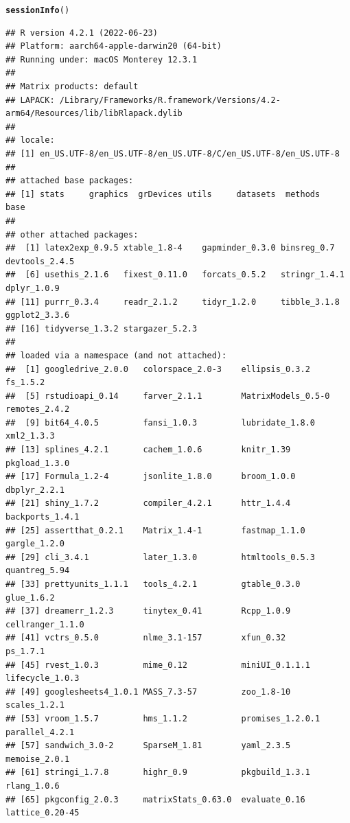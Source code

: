 \documentclass{article}\usepackage[]{graphicx}\usepackage[]{xcolor}
\makeatletter
\newcommand{\hlstd}[1]{\textcolor[rgb]{0.345,0.345,0.345}{#1}}%
\newcommand{\hlkwd}[1]{\textcolor[rgb]{0.737,0.353,0.396}{\textbf{#1}}}%
\newenvironment{kframe}{%
 \def\at@end@of@kframe{}%
 \ifinner\ifhmode%
  \def\at@end@of@kframe{\end{minipage}}%
  \begin{minipage}{\columnwidth}%
 \fi\fi%
 \def\FrameCommand##1{\hskip\@totalleftmargin \hskip-\fboxsep
 \colorbox{shadecolor}{##1}\hskip-\fboxsep
     \hskip-\linewidth \hskip-\@totalleftmargin \hskip\columnwidth}%
 \MakeFramed {\advance\hsize-\width
   \@totalleftmargin\z@ \linewidth\hsize
   \@setminipage}}%
 {\par\unskip\endMakeFramed%
 \at@end@of@kframe}
\newenvironment{knitrout}{}{} %
\makeatother
\begin{document}
\begin{knitrout}
\color{fgcolor}\begin{kframe}
\begin{alltt}
\hlkwd{sessionInfo}\hlstd{()}
\end{alltt}
\begin{verbatim}
## R version 4.2.1 (2022-06-23)
## Platform: aarch64-apple-darwin20 (64-bit)
## Running under: macOS Monterey 12.3.1
## 
## Matrix products: default
## LAPACK: /Library/Frameworks/R.framework/Versions/4.2-arm64/Resources/lib/libRlapack.dylib
## 
## locale:
## [1] en_US.UTF-8/en_US.UTF-8/en_US.UTF-8/C/en_US.UTF-8/en_US.UTF-8
## 
## attached base packages:
## [1] stats     graphics  grDevices utils     datasets  methods   base     
## 
## other attached packages:
##  [1] latex2exp_0.9.5 xtable_1.8-4    gapminder_0.3.0 binsreg_0.7     devtools_2.4.5 
##  [6] usethis_2.1.6   fixest_0.11.0   forcats_0.5.2   stringr_1.4.1   dplyr_1.0.9    
## [11] purrr_0.3.4     readr_2.1.2     tidyr_1.2.0     tibble_3.1.8    ggplot2_3.3.6  
## [16] tidyverse_1.3.2 stargazer_5.2.3
## 
## loaded via a namespace (and not attached):
##  [1] googledrive_2.0.0   colorspace_2.0-3    ellipsis_0.3.2      fs_1.5.2           
##  [5] rstudioapi_0.14     farver_2.1.1        MatrixModels_0.5-0  remotes_2.4.2      
##  [9] bit64_4.0.5         fansi_1.0.3         lubridate_1.8.0     xml2_1.3.3         
## [13] splines_4.2.1       cachem_1.0.6        knitr_1.39          pkgload_1.3.0      
## [17] Formula_1.2-4       jsonlite_1.8.0      broom_1.0.0         dbplyr_2.2.1       
## [21] shiny_1.7.2         compiler_4.2.1      httr_1.4.4          backports_1.4.1    
## [25] assertthat_0.2.1    Matrix_1.4-1        fastmap_1.1.0       gargle_1.2.0       
## [29] cli_3.4.1           later_1.3.0         htmltools_0.5.3     quantreg_5.94      
## [33] prettyunits_1.1.1   tools_4.2.1         gtable_0.3.0        glue_1.6.2         
## [37] dreamerr_1.2.3      tinytex_0.41        Rcpp_1.0.9          cellranger_1.1.0   
## [41] vctrs_0.5.0         nlme_3.1-157        xfun_0.32           ps_1.7.1           
## [45] rvest_1.0.3         mime_0.12           miniUI_0.1.1.1      lifecycle_1.0.3    
## [49] googlesheets4_1.0.1 MASS_7.3-57         zoo_1.8-10          scales_1.2.1       
## [53] vroom_1.5.7         hms_1.1.2           promises_1.2.0.1    parallel_4.2.1     
## [57] sandwich_3.0-2      SparseM_1.81        yaml_2.3.5          memoise_2.0.1      
## [61] stringi_1.7.8       highr_0.9           pkgbuild_1.3.1      rlang_1.0.6        
## [65] pkgconfig_2.0.3     matrixStats_0.63.0  evaluate_0.16       lattice_0.20-45    

\end{verbatim}
\end{kframe}
\end{knitrout}
\end{document}
